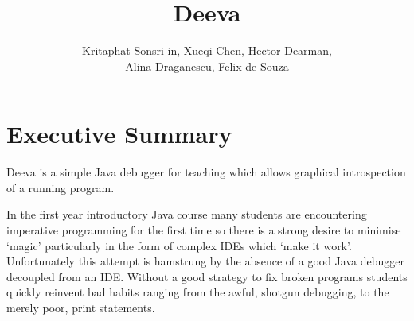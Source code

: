 \documentclass[11pt, a4paper]{article}
\newcommand{\subtitle}[1]{
  \posttitle{
    \par\end{center}
    \begin{center}\large#1\end{center}
    \vskip0.5em}
}
\begin{document}
\title{Deeva}
\subtitle{Final Report}
\author{Kritaphat Sonsri-in, Xueqi Chen, Hector Dearman, \\Alina Draganescu, Felix de Souza}

\maketitle
\thispagestyle{empty} %






\section*{Executive Summary}

Deeva is a simple Java debugger for teaching which allows graphical introspection of a running program.

In the first year introductory Java course many students are encountering imperative programming for the first time so there is a strong desire to minimise `magic' particularly in the form of complex IDEs which `make it work'.
Unfortunately this attempt is hamstrung by the absence of a good Java debugger decoupled from an IDE.
Without a good strategy to fix broken programs students quickly reinvent bad habits ranging from the awful, shotgun debugging, to the merely poor, print statements.
\end{document}
